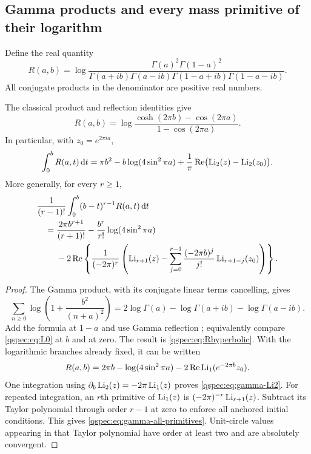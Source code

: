 \subsection{Gamma products and every mass primitive of their logarithm}
Define the real quantity
\begin{equation}\label{qspec:eq:Rgamma}
R(a,b)=\log\frac{\Gamma(a)^2\Gamma(1-a)^2}
 {\Gamma(a+ib)\Gamma(a-ib)\Gamma(1-a+ib)\Gamma(1-a-ib)}.
\end{equation}
All conjugate products in the denominator are positive real numbers.

\begin{proposition}
\label{qspec:prop:gamma-integrals}
The classical product and reflection identities give
\begin{equation}\label{qspec:eq:Rhyperbolic}
R(a,b)=\log\frac{\cosh(2\pi b)-\cos(2\pi a)}{1-\cos(2\pi a)}.
\end{equation}
In particular, with $z_0=e^{2\pi ia}$,
\begin{equation}\label{qspec:eq:gamma-Li2}
\int_0^b R(a,t)\,\mathrm{d} t
=\pi b^2-b\log(4\sin^2\pi a)
+\frac1\pi\operatorname{Re}\bigl(\operatorname{Li}_2(z)-\operatorname{Li}_2(z_0)\bigr).
\end{equation}
More generally, for every $r\ge1$,
\begin{align}
&\frac1{(r-1)!}\int_0^b(b-t)^{r-1}R(a,t)\,\mathrm{d} t\notag\\
&\quad=\frac{2\pi b^{r+1}}{(r+1)!}
-\frac{b^r}{r!}\log(4\sin^2\pi a)\notag\\
&\qquad\ -2\operatorname{Re}\left\{\frac1{(-2\pi)^r}
\left(\operatorname{Li}_{r+1}(z)-\sum_{j=0}^{r-1}\frac{(-2\pi b)^j}{j!}
\operatorname{Li}_{r+1-j}(z_0)\right)\right\}.
\label{qspec:eq:gamma-all-primitives}
\end{align}
\end{proposition}
\begin{proof}
The Gamma product, with its conjugate linear terms cancelling, gives
\[
\sum_{n\ge0}\log\left(1+\frac{b^2}{(n+a)^2}\right)
=2\log\Gamma(a)-\log\Gamma(a+ib)-\log\Gamma(a-ib).
\]
Add the formula at $1-a$ and use Gamma reflection \cite{gamma}; equivalently
compare \eqref{qspec:eq:L0} at $b$ and at zero. The result is
\eqref{qspec:eq:Rhyperbolic}. With the logarithmic branches already fixed,
it can be written
\[
R(a,b)=2\pi b-\log(4\sin^2\pi a)-2\operatorname{Re}\operatorname{Li}_1(e^{-2\pi b}z_0).
\]
One integration using $\partial_b\operatorname{Li}_2(z)=-2\pi\operatorname{Li}_1(z)$ proves
\eqref{qspec:eq:gamma-Li2}. For repeated integration, an $r$th primitive
of $\operatorname{Li}_1(z)$ is $(-2\pi)^{-r}\operatorname{Li}_{r+1}(z)$. Subtract its Taylor
polynomial through order $r-1$ at zero to enforce all anchored initial
conditions. This gives \eqref{qspec:eq:gamma-all-primitives}. Unit-circle
values appearing in that Taylor polynomial have order at least two and
are absolutely convergent.
\end{proof}
